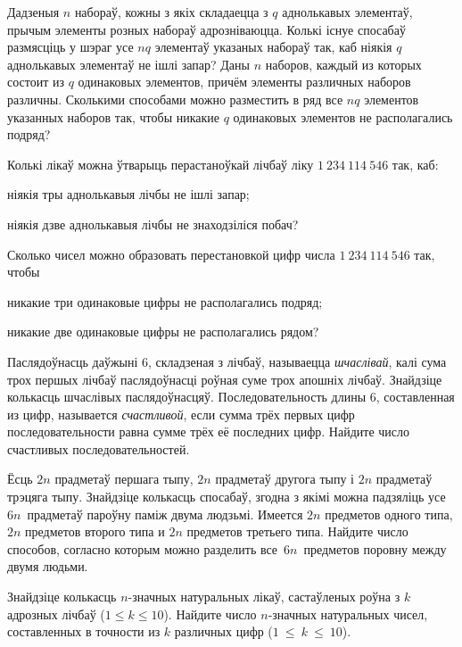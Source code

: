 \documentclass[12pt, a4paper]{article}
\begin{document}
\begin{problemList}
\bigskip

\problemItemSimple
{Дадзеныя $n$ набораў, кожны з якіх складаецца з $q$ аднолькавых элементаў, прычым
элементы розных набораў адрозніваюцца. Колькі існуе спосабаў размясціць у шэраг
усе $nq$ элементаў указаных набораў так, каб ніякія $q$ аднолькавых элементаў
не ішлі запар?}
{Даны $n$ наборов, каждый из которых состоит из $q$ одинаковых элементов, причём
элементы различных наборов различны. Сколькими способами можно разместить в ряд
все $nq$ элементов указанных наборов так, чтобы никакие $q$ одинаковых элементов
не располагались подряд?}

\bigskip

\problemItemSimple
{%
Колькі лікаў можна ўтварыць перастаноўкай лічбаў ліку $1~234~114~546$ так, каб:
\begin{belarusianEnumerate}
    \item ніякія тры аднолькавыя лічбы не ішлі запар;
    \item ніякія дзве аднолькавыя лічбы не знаходзіліся побач?
\end{belarusianEnumerate}
}
{%
Сколько чисел можно образовать перестановкой цифр числа $1~234~114~546$ так, чтобы
\begin{russianEnumerate}
    \item никакие три одинаковые цифры не располагались подряд;
    \item никакие две одинаковые цифры не располагались рядом?
\end{russianEnumerate}
}

\bigskip

\problemItemSimple
{Паслядоўнасць даўжыні 6, складзеная з лічбаў, называецца \emph{шчаслівай},
калі сума трох першых лічбаў паслядоўнасці роўная суме трох апошніх лічбаў.
Знайдзіце колькасць шчаслівых паслядоўнасцяў.}
{Последовательность длины 6, составленная из цифр, называется \emph{счастливой},
если сумма трёх первых цифр последовательности равна сумме трёх её последних цифр.
Найдите число счастливых последовательностей.}

\bigskip

\problemItemSimple
{Ёсць $2n$ прадметаў першага тыпу, $2n$ прадметаў другога тыпу і $2n$ прадметаў трэцяга тыпу.
Знайдзіце колькасць спосабаў, згодна з якімі можна падзяліць усе~$6n$~прадметаў пароўну паміж
двума людзьмі.}
{Имеется $2n$ предметов одного типа, $2n$ предметов второго типа и $2n$ предметов
третьего типа. Найдите число способов, согласно которым можно разделить все~$6n$~предметов
поровну между двумя людьми.}

\bigskip

\problemItemSimple
{Знайдзіце колькасць $n$-значных натуральных лікаў, састаўленых роўна з $k$
адрозных лічбаў ($1 \le k \le 10$).}
{Найдите число $n$-значных натуральных чисел, составленных в точности из
$k$ различных цифр ($1~\le~k~\le~10$).}

\end{problemList}
\end{document}
